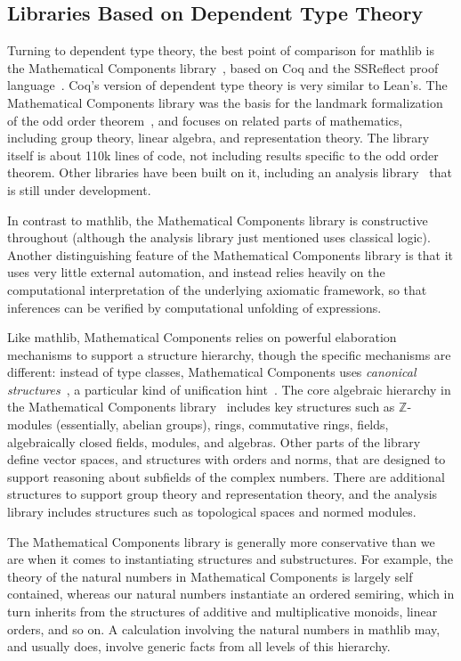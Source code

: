 \documentclass[sigplan]{acmart}\settopmatter{}
\newcommand{\mathlib}{\textsf{mathlib}\xspace}
\newcommand{\mathcomp}{Mathematical Components\xspace}
\begin{document}
\subsection{Libraries Based on Dependent Type Theory}
\label{subsection:comparison:mathcomp}

Turning to dependent type theory, the best point of comparison for \mathlib is the \mathcomp library~\cite{Mahb17}, based on Coq and the SSReflect proof language~\cite{Gon10}.
Coq's version of dependent type theory is very similar to Lean's.
The \mathcomp library was the basis for the landmark formalization of the odd order theorem~\cite{Gon10},
and focuses on related parts of mathematics, including group theory, linear algebra, and representation theory.
The library itself is about 110k lines of code, not including results specific to the odd order theorem. Other libraries have been built on it, including an analysis library~\cite{Aff18} that is still under development.

In contrast to \mathlib, the \mathcomp library is constructive throughout (although the analysis library just mentioned uses classical logic).
Another distinguishing feature of the \mathcomp library is that it uses very little external automation, and instead relies heavily on the computational interpretation of the underlying axiomatic framework, so that inferences can be verified by computational unfolding of expressions.

Like \mathlib, \mathcomp relies on powerful elaboration mechanisms to support a structure hierarchy, though the specific mechanisms are different: instead of type classes, \mathcomp uses \emph{canonical structures}~\cite{Garr09}, a particular kind of unification hint~\cite{Asp09}.
The core algebraic hierarchy in the \mathcomp library~\cite[Section 7.3]{Mahb17} includes key structures such as $\mathbb{Z}$-modules (essentially, abelian groups), rings, commutative rings, fields, algebraically closed fields, modules, and algebras.
Other parts of the library define vector spaces, and structures with orders and norms, that are designed to support reasoning about subfields of the complex numbers.
There are additional structures to support group theory and representation theory,
and the analysis library includes structures such as topological spaces and normed modules.

The \mathcomp library is generally more conservative than we are when it comes to instantiating structures and substructures.
For example, the theory of the natural numbers in \mathcomp is largely self contained, whereas our natural numbers instantiate an ordered semiring, which in turn inherits from the structures of additive and multiplicative monoids, linear orders, and so on. A calculation involving the natural numbers in \mathlib may, and usually does, involve generic facts from all levels of this hierarchy.
\end{document}
